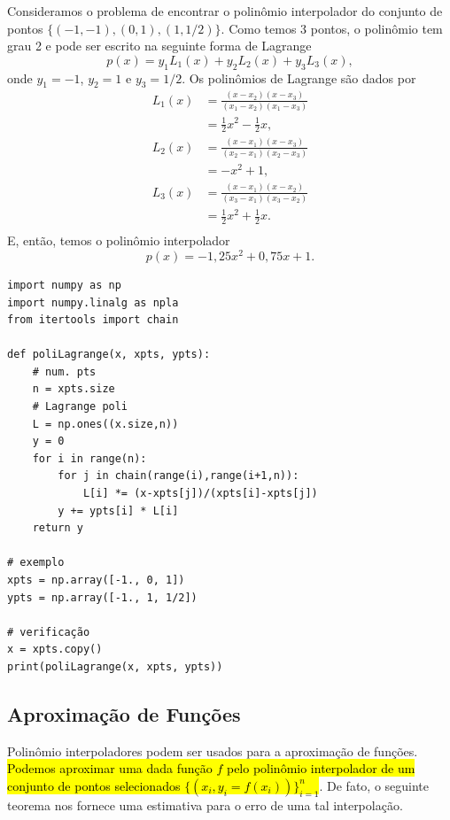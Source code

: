 \begin{ex}
  Consideramos o problema de encontrar o polinômio interpolador do conjunto de pontos $\{(-1, -1), (0, 1), (1, 1/2)\}$. Como temos 3 pontos, o polinômio tem grau 2 e pode ser escrito na seguinte forma de Lagrange
  \begin{equation}
    p(x) = y_1L_1(x) + y_2L_2(x) + y_3L_3(x),
  \end{equation}
  onde $y_1 = -1$, $y_2 = 1$ e $y_3 = 1/2$. Os polinômios de Lagrange são dados por
  \begin{align}
    L_1(x) &= \frac{(x-x_2)(x-x_3)}{(x_1-x_2)(x_1-x_3)} \\
           &= \frac{1}{2}x^2 - \frac{1}{2}x,\\
    L_2(x) &= \frac{(x-x_1)(x-x_3)}{(x_2-x_1)(x_2-x_3)} \\
           &= -x^2 + 1,\\
    L_3(x) &= \frac{(x-x_1)(x-x_2)}{(x_3-x_1)(x_3-x_2)} \\
           &= \frac{1}{2}x^2 + \frac{1}{2}x.\\
  \end{align}
  E, então, temos o polinômio interpolador
  \begin{equation}
    p(x) = -1,25x^2 + 0,75x + 1.
  \end{equation}

\begin{lstlisting}
import numpy as np
import numpy.linalg as npla
from itertools import chain

def poliLagrange(x, xpts, ypts):
    # num. pts
    n = xpts.size
    # Lagrange poli
    L = np.ones((x.size,n))
    y = 0
    for i in range(n):
        for j in chain(range(i),range(i+1,n)):
            L[i] *= (x-xpts[j])/(xpts[i]-xpts[j])
        y += ypts[i] * L[i]
    return y

# exemplo
xpts = np.array([-1., 0, 1])
ypts = np.array([-1., 1, 1/2])

# verificação
x = xpts.copy()
print(poliLagrange(x, xpts, ypts))
\end{lstlisting}
\end{ex}

\subsection{Aproximação de Funções}

Polinômio interpoladores podem ser usados para a aproximação de funções. \hl{Podemos aproximar uma dada função $f$ pelo polinômio interpolador de um conjunto de pontos selecionados $\{(x_i, y_i=f(x_i))\}_{i=1}^n$}. De fato, o seguinte teorema nos fornece uma estimativa para o erro de uma tal interpolação.

